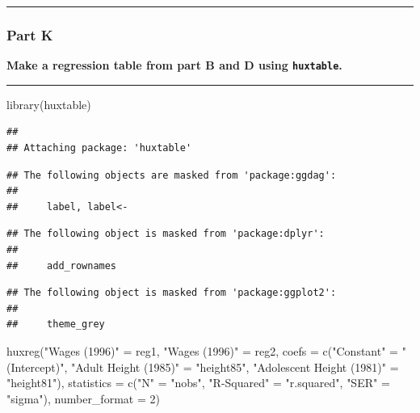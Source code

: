 \documentclass[
]{article}
\newenvironment{Shaded}{\begin{snugshade}}{\end{snugshade}}
\newcommand{\AttributeTok}[1]{\textcolor[rgb]{0.77,0.63,0.00}{#1}}
\newcommand{\DecValTok}[1]{\textcolor[rgb]{0.00,0.00,0.81}{#1}}
\newcommand{\FunctionTok}[1]{\textcolor[rgb]{0.00,0.00,0.00}{#1}}
\newcommand{\NormalTok}[1]{#1}
\newcommand{\OtherTok}[1]{\textcolor[rgb]{0.56,0.35,0.01}{#1}}
\newcommand{\StringTok}[1]{\textcolor[rgb]{0.31,0.60,0.02}{#1}}
\begin{document}
\begin{center}\rule{0.5\linewidth}{0.5pt}\end{center}

\hypertarget{part-k-1}{%
\subsubsection{Part K}\label{part-k-1}}

\textbf{Make a regression table from part B and D using
\texttt{huxtable}.}

\begin{center}\rule{0.5\linewidth}{0.5pt}\end{center}

\begin{Shaded}
\begin{Highlighting}[]
\FunctionTok{library}\NormalTok{(huxtable)}
\end{Highlighting}
\end{Shaded}

\begin{verbatim}
## 
## Attaching package: 'huxtable'
\end{verbatim}

\begin{verbatim}
## The following objects are masked from 'package:ggdag':
## 
##     label, label<-
\end{verbatim}

\begin{verbatim}
## The following object is masked from 'package:dplyr':
## 
##     add_rownames
\end{verbatim}

\begin{verbatim}
## The following object is masked from 'package:ggplot2':
## 
##     theme_grey
\end{verbatim}

\begin{Shaded}
\begin{Highlighting}[]
\FunctionTok{huxreg}\NormalTok{(}\StringTok{"Wages (1996)"} \OtherTok{=}\NormalTok{ reg1,}
       \StringTok{"Wages (1996)"} \OtherTok{=}\NormalTok{ reg2,}
       \AttributeTok{coefs =} \FunctionTok{c}\NormalTok{(}\StringTok{"Constant"} \OtherTok{=} \StringTok{"(Intercept)"}\NormalTok{,}
                 \StringTok{"Adult Height (1985)"} \OtherTok{=} \StringTok{"height85"}\NormalTok{,}
                 \StringTok{"Adolescent Height (1981)"} \OtherTok{=} \StringTok{"height81"}\NormalTok{),}
       \AttributeTok{statistics =} \FunctionTok{c}\NormalTok{(}\StringTok{"N"} \OtherTok{=} \StringTok{"nobs"}\NormalTok{,}
                      \StringTok{"R{-}Squared"} \OtherTok{=} \StringTok{"r.squared"}\NormalTok{,}
                      \StringTok{"SER"} \OtherTok{=} \StringTok{"sigma"}\NormalTok{),}
       \AttributeTok{number\_format =} \DecValTok{2}\NormalTok{)}
\end{Highlighting}
\end{Shaded}
\end{document}
